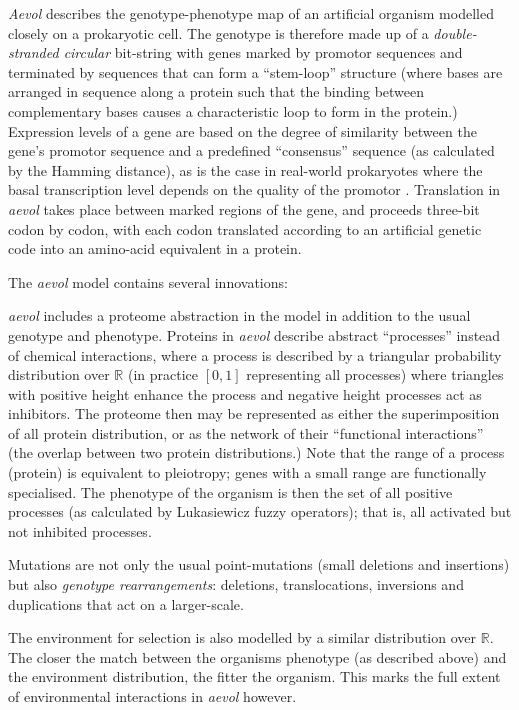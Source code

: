 \emph{Aevol} describes the genotype-phenotype map of an artificial organism modelled closely on a prokaryotic cell. The genotype is therefore made up of a \emph{double-stranded circular} bit-string with genes marked by promotor sequences and terminated by sequences that can form a ``stem-loop'' structure (where bases are arranged in sequence along a protein such that the binding between complementary bases causes a characteristic loop to form in the protein.) Expression levels of a gene are based on the degree of similarity between the gene's promotor sequence and a predefined ``consensus'' sequence (as calculated by the Hamming distance), as is the case in real-world prokaryotes where the basal transcription level depends on the quality of the promotor \parencite{Sanchez-Dehesa:2008uq}. Translation in \emph{aevol} takes place between marked regions of the gene, and proceeds three-bit codon by codon, with each codon translated according to an artificial genetic code into an amino-acid equivalent in a protein.

The \emph{aevol} model contains several innovations:

\begin{compactitem}
	\item \emph{aevol} includes a proteome abstraction in the model in addition to the usual genotype and phenotype. Proteins in \emph{aevol} describe abstract ``processes'' instead of chemical interactions, where a process is described by a triangular probability distribution over $\mathbb{R}$ (in practice $[0,1]$ representing all processes) where triangles with positive height enhance the process and negative height processes act as inhibitors. The proteome then may be represented as either the superimposition of all protein distribution, or as the network of their ``functional interactions'' (the overlap between two protein distributions.) Note that the range of a process (protein) is equivalent to \gls{pleiotropy}; genes with a small range are functionally specialised. The phenotype of the organism is then the set of all positive processes (as calculated by Lukasiewicz fuzzy operators); that is, all activated but not inhibited processes.
	\item Mutations are not only the usual point-mutations (small deletions and insertions) but also \emph{genotype rearrangements}: deletions, translocations, inversions and duplications that act on a larger-scale.
	\item The environment for selection is also modelled by a similar distribution over $\mathbb{R}$. The closer the match between the organisms phenotype (as described above) and the environment distribution, the fitter the organism. This marks the full extent of environmental interactions in \emph{aevol} however. 
\end{compactitem}

